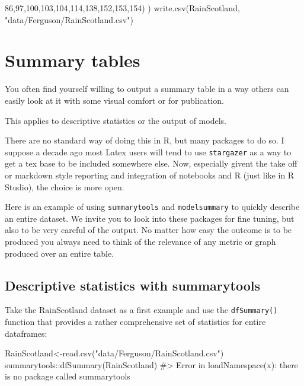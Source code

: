 \documentclass[
  letterpaper,
  DIV=11,
  numbers=noendperiod]{scrreprt}
\newenvironment{Shaded}{\begin{snugshade}}{\end{snugshade}}
\newcommand{\CommentTok}[1]{\textcolor[rgb]{0.37,0.37,0.37}{#1}}
\newcommand{\DecValTok}[1]{\textcolor[rgb]{0.68,0.00,0.00}{#1}}
\newcommand{\FunctionTok}[1]{\textcolor[rgb]{0.28,0.35,0.67}{#1}}
\newcommand{\NormalTok}[1]{\textcolor[rgb]{0.00,0.23,0.31}{#1}}
\newcommand{\OtherTok}[1]{\textcolor[rgb]{0.00,0.23,0.31}{#1}}
\newcommand{\SpecialCharTok}[1]{\textcolor[rgb]{0.37,0.37,0.37}{#1}}
\newcommand{\StringTok}[1]{\textcolor[rgb]{0.13,0.47,0.30}{#1}}
\begin{document}
\begin{Shaded}
\begin{Highlighting}[]
              \DecValTok{86}\NormalTok{,}\DecValTok{97}\NormalTok{,}\DecValTok{100}\NormalTok{,}\DecValTok{103}\NormalTok{,}\DecValTok{104}\NormalTok{,}\DecValTok{114}\NormalTok{,}\DecValTok{138}\NormalTok{,}\DecValTok{152}\NormalTok{,}\DecValTok{153}\NormalTok{,}\DecValTok{154}\NormalTok{)}
\NormalTok{    )}
\FunctionTok{write.csv}\NormalTok{(RainScotland, }\StringTok{"data/Ferguson/RainScotland.csv"}\NormalTok{)}
\end{Highlighting}
\end{Shaded}

\chapter{Summary tables}\label{sec-s}

You often find yourself willing to output a summary table in a way
others can easily look at it with some visual comfort or for
publication.

This applies to descriptive statistics or the output of models.

There are no standard way of doing this in R, but many packages to do
so. I suppose a decade ago most Latex users will tend to use
\texttt{stargazer} as a way to get a tex base to be included somewhere
else. Now, especially givent the take off or markdown style reporting
and integration of notebooks and R (just like in R Studio), the choice
is more open.

Here is an example of using \texttt{summarytools} and
\texttt{modelsummary} to quickly describe an entire dataset. We invite
you to look into these packages for fine tuning, but also to be very
careful of the output. No matter how easy the outcome is to be produced
you always need to think of the relevance of any metric or graph
produced over an entire table.

\section{Descriptive statistics with
summarytools}\label{descriptive-statistics-with-summarytools}

Take the RainScotland dataset as a first example and use the
\texttt{dfSummary()} function that provides a rather comprehensive set
of statistics for entire dataframes:

\begin{Shaded}
\begin{Highlighting}[]
\NormalTok{RainScotland}\OtherTok{\textless{}{-}}\FunctionTok{read.csv}\NormalTok{(}\StringTok{"data/Ferguson/RainScotland.csv"}\NormalTok{)}
\NormalTok{summarytools}\SpecialCharTok{::}\FunctionTok{dfSummary}\NormalTok{(RainScotland)}
\CommentTok{\#\textgreater{} Error in loadNamespace(x): there is no package called \textquotesingle{}summarytools\textquotesingle{}}
\end{Highlighting}
\end{Shaded}
\end{document}
